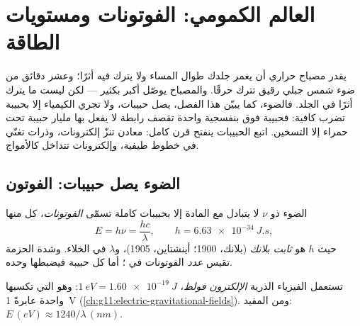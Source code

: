 \chapter{العالم الكمومي: الفوتونات ومستويات الطاقة}\label{ch:g12:quantum-world}

يقدر مصباح حراري  أن يغمر جلدك طوال المساء ولا يترك فيه أثرًا؛ وعشر
دقائق من ضوء شمس جبلي رقيق تترك حرقًا. والمصباح يوصّل  أكبر
بكثير --- لكن  ليست ما يترك أثرًا في الجلد. فالضوء، كما يبيّن هذا الفصل،
يصل حبيبات، ولا تجري الكيمياء إلا بحبيبة تضرب  كافية:
فحبيبة فوق بنفسجية واحدة تقصف رابطة لا يفعل بها مليار حبيبة تحت حمراء إلا التسخين.
اتبع الحبيبات ينفتح قرن كامل: معادن تنزّ إلكترونات، وذرات
تغنّي في خطوط طيفية، وإلكترونات تتداخل كالأمواج.

\section{الضوء يصل حبيبات: الفوتون}

\begin{definition}[الفوتون]\label{def:g12:quantum-world:photon}
الضوء ذو  $\nu$ لا يتبادل  مع المادة إلا بحبيبات كاملة
تسمّى \emph{الفوتونات}،  كل منها
\[
E = h\nu = \frac{hc}{\lambda}, \qquad h = \qty{6.63e-34}{J.s},
\]
حيث $h$ هو \emph{ثابت بلانك} (بلانك،
1900؛ أينشتاين، 1905)، و$\lambda$  في الخلاء. وشدة
الحزمة تقيس \emph{عدد} الفوتونات في ؛ أما  كل حبيبة
فيضبطها  وحده.
\end{definition}

\begin{notation}\label{not:g12:quantum-world:ev}
تستعمل الفيزياء الذرية \emph{الإلكترون فولط}،
$\qty{1}{eV} = \qty{1.60e-19}{J}$: وهو  التي تكسبها  واحدة
عابرةً \qty{1}{V} (\cref{ch:g11:electric-gravitational-fields}). ومن المفيد:
$E \,(\unit{eV}) \approx 1240/\lambda\,(\unit{nm})$.
\end{notation}

